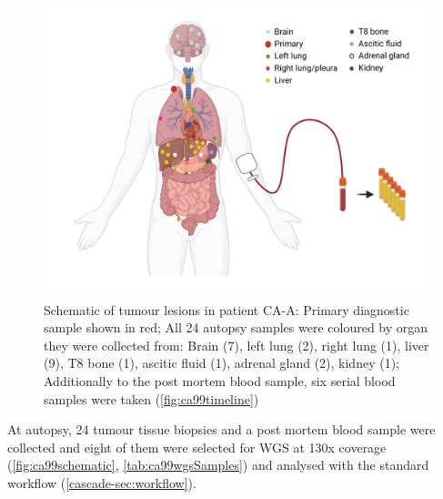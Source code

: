 \begin{figure}[ht]
\centering
\includegraphics[width=.99\linewidth]{Figures/CASCADE/CA99/CA-A_schematic_CA99_organColours}
\caption[Schematic of tumour lesions in patient CA-A]{Schematic of tumour lesions in patient CA-A: Primary diagnostic sample shown in red; All 24 autopsy samples were coloured by organ they were collected from: Brain (7), left lung (2), right lung (1), liver (9), T8 bone (1), ascitic fluid (1), adrenal gland (2), kidney (1); Additionally to the post mortem blood sample, six serial blood samples were taken (\protect\autoref{fig:ca99timeline})} \label{fig:ca99schematic}
\end{figure}


At autopsy, 24 tumour tissue biopsies and a post mortem blood sample were collected and eight of them were selected for WGS at 130x coverage (\autoref{fig:ca99schematic}, \autoref{tab:ca99wgsSamples}) and analysed with the standard workflow (\autoref{cascade-sec:workflow}).

